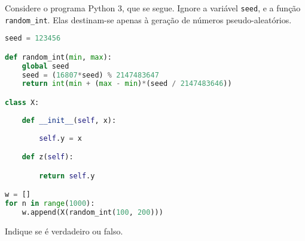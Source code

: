 \documentclass[12pt,varwidth=16cm,border=17pt]{standalone}
\begin{document}
Considere o programa Python 3, que se segue. Ignore a variável \verb+seed+, e a função \verb+random_int+. 
Elas destinam-se apenas à geração de números pseudo-aleatórios.

\begin{lstlisting}[language=Python]
seed = 123456

def random_int(min, max):
    global seed
    seed = (16807*seed) % 2147483647
    return int(min + (max - min)*(seed / 2147483646))

class X:
    
    def __init__(self, x):
        
        self.y = x

    def z(self):

        return self.y

w = []
for n in range(1000):
    w.append(X(random_int(100, 200)))
\end{lstlisting}

Indique se é verdadeiro ou falso.
\end{document}
